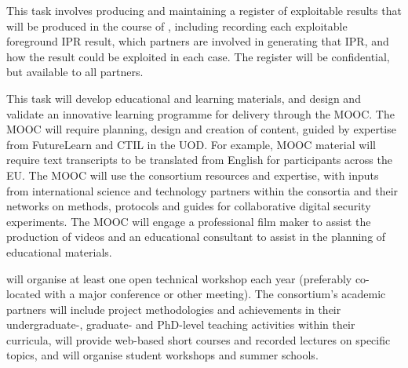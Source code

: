 \begin{Workpackage}{\thewpno}
\begin{Task}
\TaskResults{%
\ref{del:dissemplan1};
\ref{del:dissemplan2}
}
\TaskHeader{}

This task involves producing and maintaining a register of exploitable results that will be produced in the course of \TheProject{}, including recording each exploitable foreground IPR result, which partners are involved in generating that IPR, and how the result could be exploited in each case.
The register will be confidential, but available to all partners.
\end{Task}

\begin{Task}


\TaskResults{%
\ref{del:mooc}
\ref{del:dissemplan3}
}
\TaskHeader{}

This task will develop educational and learning materials, and
design and validate an innovative learning programme for delivery through the \TheProject{} MOOC. The MOOC will require planning, design and creation of content, guided by expertise from FutureLearn and CTIL in the UOD.  For example, MOOC material will require 
 text transcripts to be translated from English for participants across the EU. The MOOC will use the \TheProject{}
consortium resources and expertise, with inputs from international science and technology partners within the \TheProject{}
consortia and their networks on methods, protocols and guides for collaborative digital security experiments.  The MOOC will engage a professional film maker to assist the production of videos and an educational consultant to assist in the planning of educational materials.


\TheProject{} will organise at least one open technical workshop each year
(preferably co-located with a major conference or other meeting).
The consortium's academic partners will include project methodologies and achievements in their undergraduate-, graduate- and PhD-level teaching activities within their curricula, will provide web-based short courses and recorded lectures on specific \TheProject topics, and will organise student workshops and summer schools.
\end{Task}


\end{Workpackage}
